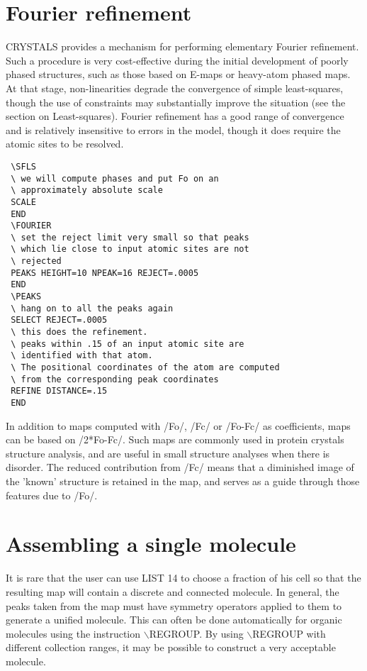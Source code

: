 \documentclass[10pt,a4paper]{report}
\begin{document}
\section{Fourier refinement}


CRYSTALS provides a mechanism for performing elementary Fourier refinement.
 Such a procedure is very cost-effective during the initial development of
 poorly phased structures, such as those based on E-maps or heavy-atom phased 
 maps. At that stage, non-linearities degrade the convergence of simple
 least-squares, though the use of constraints may substantially improve the
 situation (see the section on Least-squares). Fourier refinement has a
 good range of convergence and is relatively insensitive to errors in the
 model, though it does require the atomic sites to be resolved.

\small\begin{verbatim}
 \SFLS
 \ we will compute phases and put Fo on an 
 \ approximately absolute scale
 SCALE
 END
 \FOURIER
 \ set the reject limit very small so that peaks 
 \ which lie close to input atomic sites are not 
 \ rejected
 PEAKS HEIGHT=10 NPEAK=16 REJECT=.0005
 END
 \PEAKS
 \ hang on to all the peaks again
 SELECT REJECT=.0005
 \ this does the refinement.
 \ peaks within .15 of an input atomic site are 
 \ identified with that atom.
 \ The positional coordinates of the atom are computed 
 \ from the corresponding peak coordinates
 REFINE DISTANCE=.15
 END
\end{verbatim}\normalsize




In addition to maps computed with /Fo/, /Fc/ or /Fo-Fc/ as coefficients,
 maps can be based on /2*Fo-Fc/. Such maps are commonly used in protein
 crystals structure analysis, and are useful in small structure analyses
 when there is disorder. The reduced contribution from /Fc/ means that
 a diminished image of the 'known' structure is retained in the map, and
 serves as a guide through those features due to /Fo/.
\section{Assembling a single molecule}


It is rare that the user can use LIST 14 to choose a fraction of his cell 
 so that the resulting map will contain a discrete and connected molecule.
 In general, the peaks taken from the map must have symmetry operators applied 
 to them to generate a unified molecule. This can often be done automatically
 for organic molecules using the instruction $\backslash$REGROUP. By using $\backslash$REGROUP with
 different collection ranges, it may be possible to construct a very acceptable
 molecule.
\end{document}

